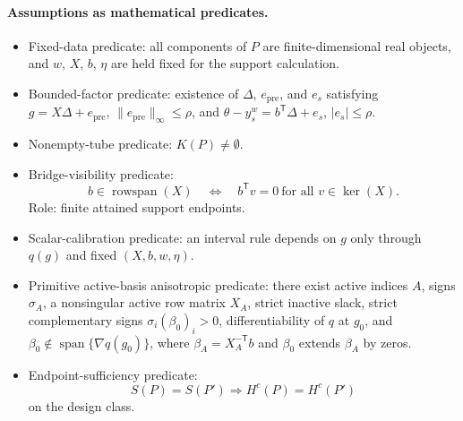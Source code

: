 \documentclass[11pt]{article}
\newcommand{\transpose}{\mathsf{T}}
\theoremstyle{definition}
\theoremstyle{plain}
\theoremstyle{remark}
\begin{document}
\paragraph{Assumptions as mathematical predicates.}
\begin{itemize}[leftmargin=*]
\item Fixed-data predicate: all components of \(P\) are finite-dimensional real
objects, and \(w\), \(X\), \(b\), \(\eta\) are held fixed for the support
calculation.
\item Bounded-factor predicate: existence of \(\Delta\), \(e_{\mathrm{pre}}\),
and \(e_s\) satisfying \(g=X\Delta+e_{\mathrm{pre}}\),
\(\|e_{\mathrm{pre}}\|_\infty\le\rho\), and
\(\theta-y_s^w=b^\transpose\Delta+e_s\), \(|e_s|\le\rho\).
\item Nonempty-tube predicate: \(K(P)\ne\emptyset\).
\item Bridge-visibility predicate:
\[
b\in\operatorname{rowspan}(X)
\quad\Longleftrightarrow\quad
b^\transpose v=0\ \text{for all }v\in\ker(X).
\]
Role: finite attained support endpoints.
\item Scalar-calibration predicate: an interval rule depends on \(g\) only
through \(q(g)\) and fixed \((X,b,w,\eta)\).
\item Primitive active-basis anisotropic predicate: there exist active indices
\(A\), signs \(\sigma_A\), a nonsingular active row matrix \(X_A\), strict
inactive slack, strict complementary signs
\(\sigma_i(\beta_0)_i>0\), differentiability of \(q\) at \(g_0\), and
\(\beta_0\notin\operatorname{span}\{\nabla q(g_0)\}\), where
\(\beta_A=X_A^{-\transpose}b\) and \(\beta_0\) extends \(\beta_A\) by zeros.
\item Endpoint-sufficiency predicate:
\[
S(P)=S(P')\Rightarrow H^c(P)=H^c(P')
\]
on the design class.
\end{itemize}
\end{document}
